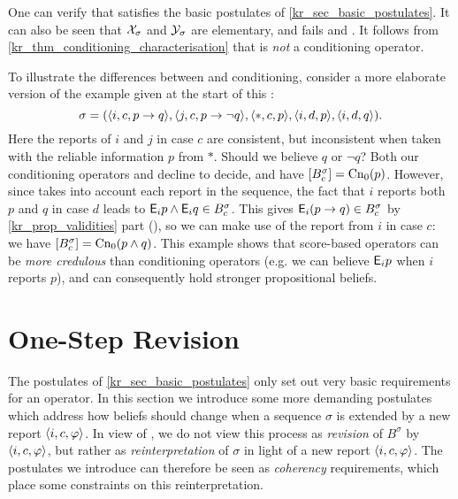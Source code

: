 One can verify that \scorebasedop{} satisfies the basic postulates of
\cref{kr_sec_basic_postulates}. It can also be seen that $\mathcal{X}_\sigma$ and
$\mathcal{Y}_\sigma$ are elementary, and \scorebasedop{} fails \duprem{} and \incvac{}.
It follows from
\cref{kr_thm_conditioning_characterisation} that \scorebasedop{} is \emph{not} a
conditioning operator.\footnotemark{}


\begin{example}
\label{kr_ex_score_based}
     To illustrate the differences between \scorebasedop{} and conditioning,
     consider a more elaborate version of the
     example given at the start of this :
     \[
        \sigma = (
            \langle {i, c, p \rightarrow q} \rangle,
            \langle {j, c, p \rightarrow \neg q} \rangle,
            \langle {\ast, c, p} \rangle,
            \langle {i, d, p} \rangle,
            \langle {i, d, q} \rangle
        ).
     \]
     Here the reports of $i$ and $j$ in case $c$ are consistent,
     but inconsistent when taken with
     the reliable information $p$ from $\ast$. Should we believe $q$ or $\neg
     q$? Both our conditioning operators \varbasedcond{} and \partbasedcond{}
     decline to decide, and have $\left[{B^\sigma_c}\right] = \operatorname{Cn}_0(p)$. However,
     since \scorebasedop{} takes into account each report in the
     sequence, the fact that $i$ reports both $p$ and $q$ in case $d$ leads to
     $\mathsf{E}_i{p} \land \mathsf{E}_i{q} \in B^\sigma_c$. This gives $\mathsf{E}_i(p \rightarrow q)
     \in B^\sigma_c$ by \cref{kr_prop_validities} part
     (), so we can make use of the report
     from $i$ in case $c$: we have $\left[{B^\sigma_c}\right] = \operatorname{Cn}_0(p \land
     q)$.
     This example shows that score-based operators can be \emph{more credulous}
     than conditioning operators (e.g. we can believe $\mathsf{E}_i{p}$ when
     $i$ reports $p$), and can consequently hold stronger propositional
     beliefs.

\end{example}

\section{One-Step Revision}
\label{kr_sec_one_step_postulates}

The postulates of \cref{kr_sec_basic_postulates} only set out very basic
requirements for an operator. In this section we introduce some more demanding
postulates which address how beliefs should change when a sequence $\sigma$ is
extended by a new report $\langle {i, c, \varphi} \rangle$.  In view of \rearr{}, we do not
view this process as \emph{revision} of $B^\sigma$ by $\langle {i, c, \varphi} \rangle$, but
rather as \emph{reinterpretation} of $\sigma$ in light of a new report
$\langle {i, c, \varphi} \rangle$. The postulates we introduce can therefore be seen as
\emph{coherency} requirements, which place some constraints on this
reinterpretation.

